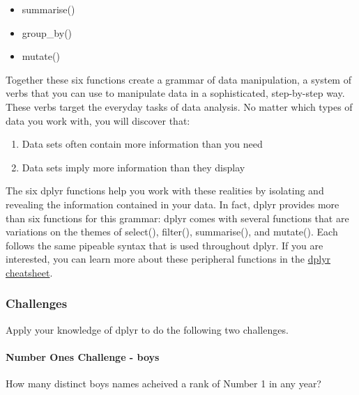\documentclass[
]{article}
\newenvironment{Shaded}{\begin{snugshade}}{\end{snugshade}}
\newcommand{\AttributeTok}[1]{\textcolor[rgb]{0.77,0.63,0.00}{#1}}
\newcommand{\DecValTok}[1]{\textcolor[rgb]{0.00,0.00,0.81}{#1}}
\newcommand{\FunctionTok}[1]{\textcolor[rgb]{0.00,0.00,0.00}{#1}}
\newcommand{\NormalTok}[1]{#1}
\newcommand{\OtherTok}[1]{\textcolor[rgb]{0.56,0.35,0.01}{#1}}
\newcommand{\SpecialCharTok}[1]{\textcolor[rgb]{0.00,0.00,0.00}{#1}}
\newcommand{\StringTok}[1]{\textcolor[rgb]{0.31,0.60,0.02}{#1}}
\providecommand{\tightlist}{%
  \setlength{\itemsep}{0pt}\setlength{\parskip}{0pt}}
\begin{document}
\begin{itemize}
\tightlist
\item
  summarise()
\item
  group\_by()
\item
  mutate()
\end{itemize}

Together these six functions create a grammar of data manipulation, a
system of verbs that you can use to manipulate data in a sophisticated,
step-by-step way. These verbs target the everyday tasks of data
analysis. No matter which types of data you work with, you will discover
that:

\begin{enumerate}
\def\labelenumi{\arabic{enumi}.}
\tightlist
\item
  Data sets often contain more information than you need
\item
  Data sets imply more information than they display
\end{enumerate}

The six dplyr functions help you work with these realities by isolating
and revealing the information contained in your data. In fact, dplyr
provides more than six functions for this grammar: dplyr comes with
several functions that are variations on the themes of select(),
filter(), summarise(), and mutate(). Each follows the same pipeable
syntax that is used throughout dplyr. If you are interested, you can
learn more about these peripheral functions in the
\href{https://github.com/rstudio/cheatsheets/raw/master/source/pdfs/data-transformation-cheatsheet.pdf}{dplyr
cheatsheet}.

\hypertarget{challenges}{%
\subsubsection{Challenges}\label{challenges}}

Apply your knowledge of dplyr to do the following two challenges.

\hypertarget{number-ones-challenge---boys}{%
\paragraph{Number Ones Challenge -
boys}\label{number-ones-challenge---boys}}

How many distinct boys names acheived a rank of Number 1 in any year?

\begin{Shaded}
\end{Shaded}
\end{document}
